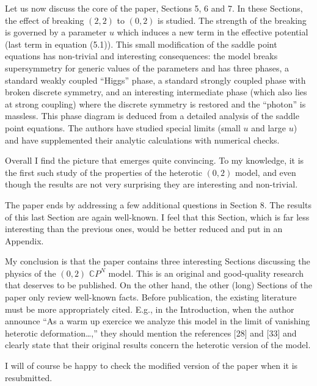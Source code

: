 \documentclass[12pt]{article}
\begin{document}
Let us now discuss the core of the paper, Sections 5, 6 and 7. In
these Sections, the effect of breaking $(2,2)$ to $(0,2)$ is studied.
The strength of the breaking is governed by a parameter $u$ which
induces a new term in the effective potential (last term in equation
(5.1)). This small modification of the saddle point equations has
non-trivial and interesting consequences: the model breaks
supersymmetry for generic values of the parameters and has three
phases, a standard weakly coupled ``Higgs'' phase, a standard strongly
coupled phase with broken discrete symmetry, and an interesting
intermediate phase (which also lies at strong coupling) where the
discrete symmetry is restored and the ``photon'' is massless. This
phase diagram is deduced from a detailed analysis of the saddle point
equations. The authors have studied special limits (small $u$ and
large $u$) and have supplemented their analytic calculations with
numerical checks.

Overall I find the picture that emerges quite convincing. To my
knowledge, it is the first such study of the properties of the
heterotic $(0,2)$ model, and even though the results are not very
surprising they are interesting and non-trivial.

The paper ends by addressing a few additional questions in Section 8.
The results of this last Section are again well-known. I feel that
this Section, which is far less interesting than the previous ones,
would be better reduced and put in an Appendix.

My conclusion is that the paper contains three interesting Sections
discussing the physics of the $(0,2)$ $\mathbb CP^{N}$ model. This is
an original and good-quality research that deserves to be published.
On the other hand, the other (long) Sections of the paper only review
well-known facts. Before publication, the existing literature must be
more appropriately cited. E.g., in the Introduction, when the author
announce ``As a warm up exercice we analyze this model in the limit of
vanishing heterotic deformation\ldots,'' they should mention the
references [28] and [33] and clearly state that their original results
concern the heterotic version of the model.

I will of course be happy to check the modified version of the paper
when it is resubmitted.
\end{document}
